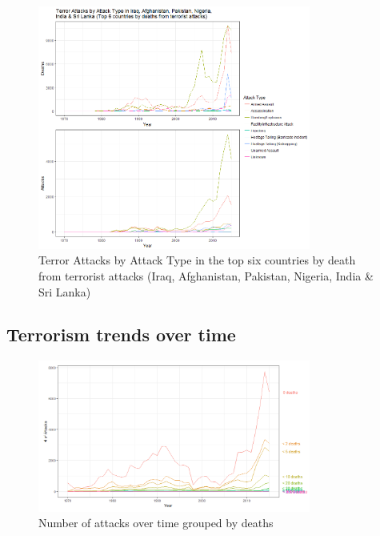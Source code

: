 \documentclass[10pt,a4paper]{article}
\begin{document}
\begin{center}
\begin{figure}[h!]
		
	\includegraphics[width=0.8\textwidth]{Plots/AttackType/Top6.png}
	\caption{Terror Attacks by Attack Type in the top six countries by death from terrorist attacks (Iraq, Afghanistan, Pakistan, Nigeria, India \& Sri Lanka)}
	
\end{figure}
\end{center}

\subsection{Terrorism trends over time}
\begin{center}
\begin{figure}[h!]
		
	\includegraphics[width=0.8\textwidth]{Plots/OverTime/Attacks_over_time_grouped_by_deaths.png}
	\caption{Number of attacks over time grouped by deaths}

\end{figure}
\end{center}
\end{document}

